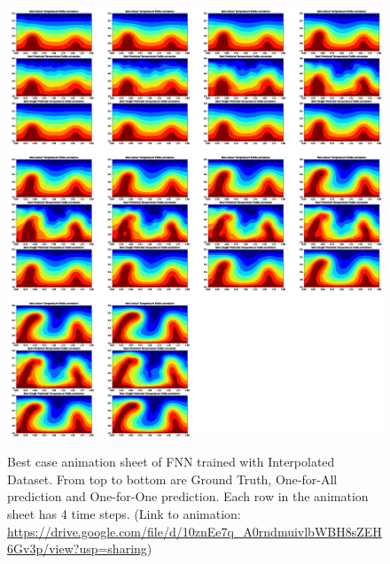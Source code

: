 \begin{figure}[H]
    \centering
    \caption{Best case animation sheet of FNN trained with Interpolated Dataset. From top to bottom are Ground Truth, One-for-All prediction and One-for-One prediction. Each row in the animation sheet has 4 time steps. (Link to animation: \url{https://drive.google.com/file/d/10znEe7q_A0rndmuivlbWBH8sZEH6Gv3p/view?usp=sharing})}
    \includegraphics[scale=0.23]{figures/mantle_convection_images/larger_dataset_interpolated/FNN_Best_GIF_sheet.png}
    \label{figure:FNN_interpolated_best_gif}
\end{figure}

